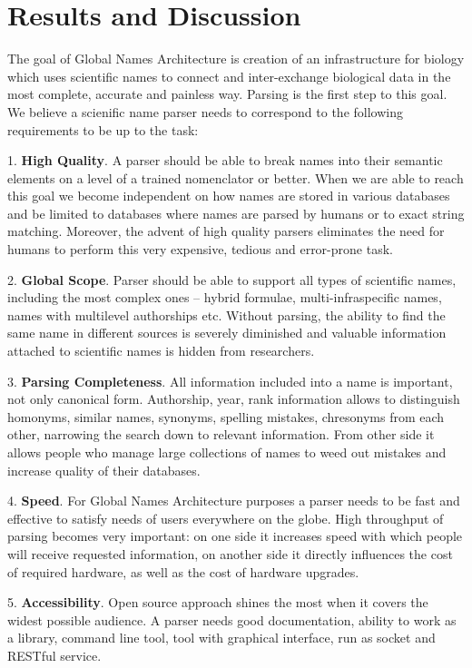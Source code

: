 \documentclass{bmcart}
\begin{document}
\section*{Results and Discussion}

The goal of Global Names Architecture is creation of an infrastructure for
biology which uses scientific names to connect and inter-exchange biological
data in the most complete, accurate and painless way. Parsing is the first
step to this goal. We believe a scienific name parser needs to correspond to
the following requirements to be up to the task:

1. \textbf{High Quality}. A parser should be able to break names into their
semantic elements on a level of a trained nomenclator or better. When we are
able to reach this goal we become independent on how names are stored in
various databases and be limited to databases where names are parsed by humans
or to exact string matching. Moreover, the advent of high quality parsers
eliminates the need for humans to perform this very expensive, tedious and
error-prone task.

2. \textbf{Global Scope}. Parser should be able to support all types of
scientific names, including the most complex ones -- hybrid formulae,
multi-infraspecific names, names with multilevel authorships etc. Without
parsing, the ability to find the same name in different sources is severely
diminished and valuable information attached to scientific names is hidden
from researchers.

3. \textbf{Parsing Completeness}. All information included into a name is
important, not only canonical form. Authorship, year, rank information allows
to distinguish homonyms, similar names, synonyms, spelling mistakes,
chresonyms from each other, narrowing the search down to relevant information.
From other side it allows people who manage large collections of names to weed
out mistakes and increase quality of their databases.

4. \textbf{Speed}. For Global Names Architecture purposes a parser needs to be
fast and effective to satisfy needs of users everywhere on the globe.  High
throughput of parsing becomes very important: on one side it increases speed
with which people will receive requested information, on another side it
directly influences the cost of required hardware, as well as the cost of
hardware upgrades.

5. \textbf{Accessibility}. Open source approach shines the most when it covers
the widest possible audience. A parser needs good documentation, ability to
work as a library, command line tool, tool with graphical interface, run as
socket and RESTful service.
\end{document}
